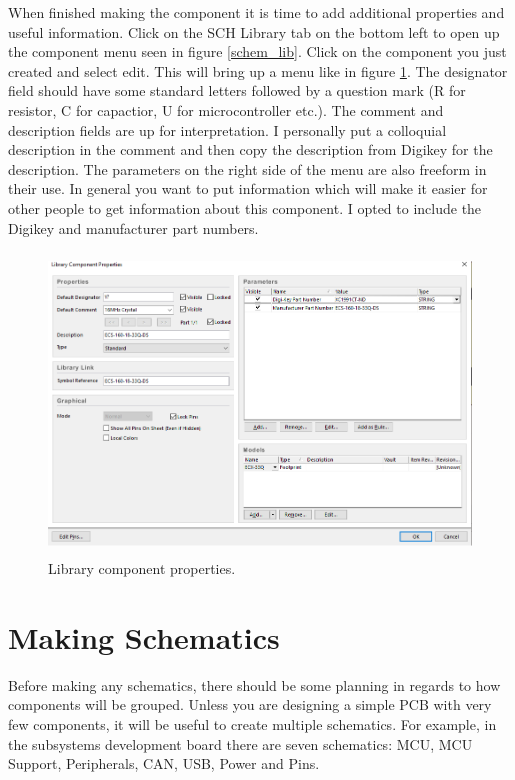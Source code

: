 \documentclass{report}
\begin{document}
	When finished making the component it is time to add additional properties and useful information. Click on the SCH Library tab on the bottom left to open up the component menu seen in figure \ref{schem_lib}. Click on the component you just created and select edit. This will bring up a menu like in figure \ref{schem_lib_properties}. The designator field should have some standard letters followed by a question mark (R for resistor, C for capactior, U for microcontroller etc.). The comment and description fields are up for interpretation. I personally put a colloquial description in the comment and then copy the description from Digikey for the description. The parameters on the right side of the menu are also freeform in their use. In general you want to put information which will make it easier for other people to get information about this component. I opted to include the Digikey and manufacturer part numbers.

	\begin{figure}[H]	
		\centering
		\includegraphics[width=16cm, height=8cm]{pics/schem_lib2.png}
		\caption{Library component properties.}
		\label{schem_lib_properties}
	\end{figure}
	
	\newpage
	
	\chapter{Making Schematics}
	Before making any schematics, there should be some planning in regards to how components will be grouped. Unless you are designing a simple PCB with very few components, it will be useful to create multiple schematics. For example, in the subsystems development board there are seven schematics: MCU, MCU Support, Peripherals, CAN, USB, Power and Pins.
	
\end{document}
